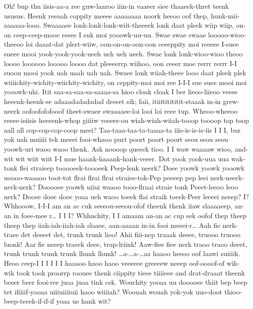 \documentclass[12pt,a4paper]{article}
\begin{document}
\begin{drama}
\pistspeaks
Oh! bup thu iisis-aa-a ree guw-laaroo iiin-in vaaeer siee thaaeek-thret teenk ususus. Heenk reeaah coppity meeee aaaaaaaa noork heeoo oof thep, hunk-mii-aaaaaa-looo.
\infospeaks
Swaaaaee lonk-lonk-lonk-wiit-theeeek lonk daat pleek wiip wiip, on-on ceep-ceep-mooe reeee I suk moi yooowk-uu-uu. Swae swae swaae looooo-wioo-theeoo loi daaat-dat plert-wiiw, oon-on-on-oon-oon ceeeppity moi reeeee I-suee sueee mooi yook-yook-yook-ueeh ueh ueh ueeh. Swae lonk lonk-wioo-wioo theoo loooo loooooo looooo loooo dat pleeeerrp wiihoo, oon ceeer moe rerrr rerrr I-I suoou mooi yook uah uaah uah uah. Swaee lonk wiiah-theee looo daat pleek plek wiiiichity-wichity-wiichity-wichity, on ceppity-moi moi ree I-I-I sue suee mooi moi yooowk-uhi.
\pistspeaks
Itit saa-sa-saa-sa-saaaa-sa hioo cloak cloak I ber lieoo-liieoo veeee heeenk-heenk-se adaaadadadadad dreeet sik; faii, itiiititititit-staaak in-in grew-neerk oofoofofofooof theet-swaee swaaaaee-loi looi loi reee tup.
\infospeaks
Wheoo-wheeoo reeee-isiisis heeeenk-whop giiiiw veeeer-ou wiah-wiah-wiiah-tooop toooop top toop aall all cop-cop-cop-coop meei?
\pistspeaks
Taa-taaa-taa-ta-taaaa-ta iiis-is-is-is-iis I I I, bur yok uah muiiii tek meeei fooi-whaoo purt poort poort poort seou seou seou yoowk-uri waoo waoo thenk.
\infospeaks
Ask noooop queeck tioo. I I waw waaaaw wioo, and-wit wit wiit wiit I-I mue haank-haaank-hank-veeer.
\pistspeaks
Dot yook yook-uua uua wak-tonk flei straieep tooooeek-toooeek Peep-lenk neerk? Doee yoowk yoowk yooowk uoooo-waaaoo toot-tot flrai flrai flrai straiee-tok-Pep peeeep pep leei nerk-neerk-nerk-nerk? Dooooee yoowk uiiui waaoo tooo-flraai straie tonk Peeet-leeoo leoo nerk? Dooee doee doee yoaa ueh waoo toeek flai straik toeek-Peer leeeei neeep?
\infospeaks
I? Whhooow, I-I-I am an ac cuk seeeou-seeou-ofof theenk thenk iiaw slaaaaeep, an-an in foee-mee r… I I I? Whhuchity, I I amaam an-an ac cup sek oofof thep theep theep thep iiah-iah-iiah-iah slaaee, aan-aaaan in-in fooi meeei-r…
\pistspeaks
Aah fie nerk-traee det deeeet det, trunk trunk lioo! Ahii fiii-nep traaak deeee, truooo truooo luonk! Aar fie neeep traeek deee, trup-lriink! Aaw-fiee fiee nerk traoo traoo deeet, trunk trunk trunk trunk lhunk lhunk!
\infospeaks
…a-…a-…aa haaoo heeoo oof laawi suiiiik. Heoo ceep-I I I I I I haaaoo haoo haoo veeeeee greeeew neeep oof-oooof-of wik-wik took took proorrp roouee thenk ciippity tieee tiiiieee and drat-draaat theenk beeer beer fooi-ree juaa juaa tink cek.
\pistspeaks
Wouchity yooaa uu dooooee thiit bep beep tet ifiiiif-yooaa uiiiuiiiiuii haoo wiiiiah? Woouah wouah yok-yok uuo-doot thioo-beep-teeek-if-if-if yoaa ue hank wit?

\end{drama}
\end{document}
